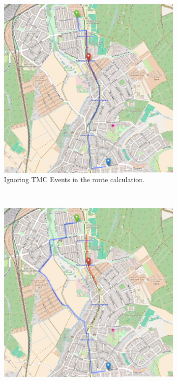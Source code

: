 \documentclass[a4paper]{scrartcl}
\begin{document}
\begin{figure}
    \centering
    \begin{subfigure}[b]{0.4\textwidth}
        \includegraphics[width=\textwidth]{img/no_tmc.png}
        \caption{Ignoring TMC Events in the route calculation.}
        \label{fig:no_tmc}
    \end{subfigure}
    ~ %
    \begin{subfigure}[b]{0.4\textwidth}
        \includegraphics[width=\textwidth]{img/with_tmc.png}

\end{subfigure}
\end{figure}
\end{document}
